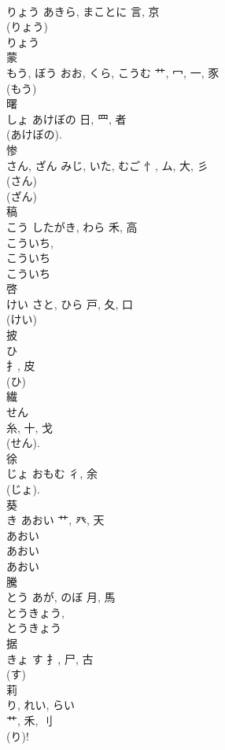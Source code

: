 \documentclass[8pt]{extreport}
\begin{document}
\begin{CJK}{UTF8}{min}
\\	りょう	あきら, まことに	言, 京	
\\	(りょう) 
\\	りょう 
\\	蒙	
\\	もう, ぼう	おお, くら, こうむ	艹, 冖, 一, 豕	
\\	(もう) 
\\	曙	
\\	しょ	あけぼの	日, 罒, 者	
\\	(あけぼの). 
\\	惨	
\\	さん, ざん	みじ, いた, むご	忄, ム, 大, 彡	
\\	(さん) 
\\	(ざん) 
\\	稿	
\\	こう	したがき, わら	禾, 高	
\\	こういち, 
\\	こういち 
\\	こういち
\\	啓	
\\	けい	さと, ひら	戸, 夂, 口	
\\	(けい) 
\\	披	
\\	ひ	
\\	扌, 皮	
\\	(ひ) 
\\	繊	
\\	せん	
\\	糸, 十, 戈		
\\	(せん). 
\\	徐	
\\	じょ	おもむ	彳, 余	
\\	(じょ). 
\\	葵	
\\	き	あおい	艹, 癶, 天	
\\	あおい 
\\	あおい 
\\	あおい 
\\	騰	
\\	とう	あが, のぼ	月, 馬		
\\	とうきょう, 
\\	とうきょう 
\\	据	
\\	きょ	す	扌, 尸, 古	
\\	(す) 
\\	莉	
\\	り, れい, らい	
\\	艹, 禾, 刂	
\\	(り)!	

\end{CJK}
\end{document}
